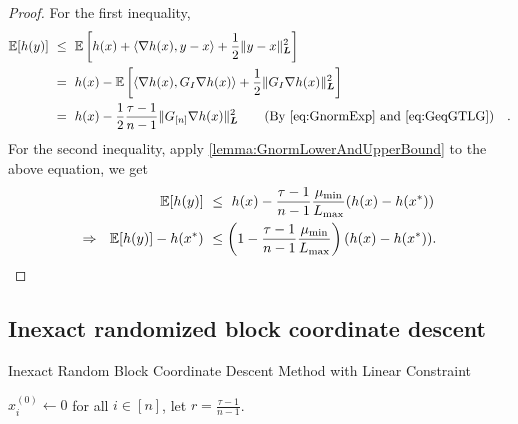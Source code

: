 \begin{proof}
    For the first inequality,
    \begin{align*}
       \mE[ h(y) ] &~\leq~ \mE \left[ h(x) + \langle \nabla h(x), y - x \rangle + \frac{1}{2} \| y - x \|_{\bL}^2 \right] \\
       &~=~ h(x) - \mE \left[ \langle \nabla h(x), G_I \nabla h(x) \rangle + \frac{1}{2}  \| G_I \nabla h(x) \|_{\bL}^2 \right] \\
       &~=~ h(x) - \frac{1}{2} \frac{\tau-1}{n-1} \| G_{[n]} \nabla h(x) \|_{\bL}^2 \quad \text{(By \autoref{eq:GnormExp} and \autoref{eq:GeqGTLG})}.
    \end{align*}
    For the second inequality, apply \autoref{lemma:GnormLowerAndUpperBound} to the above equation, we get
    \begin{align*}
        \mathbb{E}[ h(y) ] &~\leq~ h(x) - \frac{\tau-1}{n-1} \frac{\mu_{\min}}{L_{\max}} ( h( x ) - h(x^*) ) \\
        \Rightarrow~~ \mathbb{E}[ h(y) ] - h(x^*) &~\leq \left(1 -  \frac{\tau-1}{n-1} \frac{\mu_{\min}}{L_{\max}} \right) ( h(x) - h(x^*) ). 
    \end{align*}
\end{proof}


\subsection{Inexact randomized block coordinate descent} \label{appendix:inexact_rbcd}

\begin{algorithm}[t] 
    \DontPrintSemicolon
    \caption{Inexact Random Block Coordinate Descent Method with Linear Constraint}
    \label{alg:inexactrbcd}
    \smallskip
    $x_i^{(0)} \gets 0$ for all $i \in [n]$, let $r =\frac{\tau-1}{n-1}$. 
\end{algorithm}

